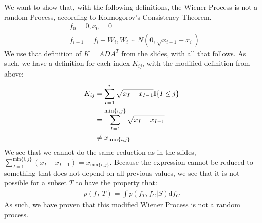 We want to show that, with the following definitions, the Wiener Process is not a random Process, according to Kolmogorov's Consistency Theorem.
\begin{align*}
  &f_0=0, x_0=0 \\
  &f_{i+1}=f_i+W_i, W_i \sim N\left(0, \sqrt{x_{i+1}-x_i}\right)
\end{align*}
We use that definition of $K = ADA^T$ from the slides, with all that follows. As such, we have a definition for each index $K_{ij}$, with the modified definition from above:
\begin{align*}
  K_{ij} &= \sum_{I=1}^i \sqrt{x_I - x_{I-1}} \mathbb{I}\{I\leq j\} \\
  &= \sum_{I=1}^{\text{min}\{i,j\}}\sqrt{x_I - x_{I-1}} \\
  &\centernot = x_{\text{min}\{i,j\}}
\end{align*}
We see that we cannot do the same reduction as in the slides, $\sum_{I=1}^{\text{min}\{i,j\}}(x_I - x_{I-1}) = x_{\text{min}\{i,j\}}$. Because the expression cannot be reduced to something that does not depend on all previous values, we see that it is not possible for a subset $T$ to have the property that:
\begin{align*}
  p(f_T|T) = \int p(f_T,f_C|S) \text{d}f_C
\end{align*}
As such, we have proven that this modified Wiener Process is not a random process.
